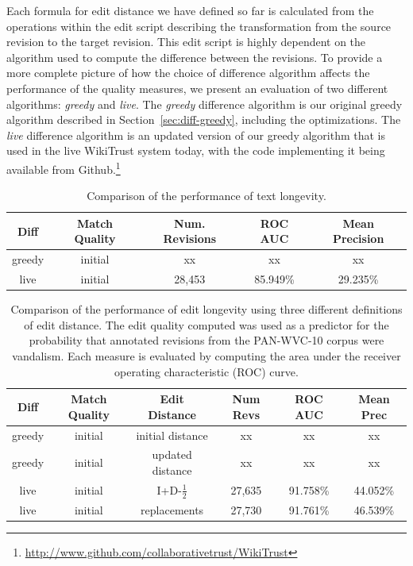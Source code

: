 Each formula for edit distance we have defined so far is calculated
from the operations within the edit script describing the transformation
from the source revision to the target revision.
This edit script is highly dependent on the algorithm used to
compute the difference between the revisions.
To provide a more complete picture of how the choice of difference
algorithm affects the performance of the quality measures,
we present an evaluation of two different algorithms:
\textit{greedy} and \textit{live}.
The \textit{greedy} difference algorithm is our original greedy
algorithm described in Section~\ref{sec:diff-greedy}, including
the optimizations.
The \textit{live} difference algorithm is an updated version of
our greedy algorithm that is used in the live WikiTrust system today,
with the code implementing it being available from
Github.\footnote{\url{http://www.github.com/collaborativetrust/WikiTrust}}

\begin{table}[tbph]
\begin{center}
\begin{tabular}{|c|c||c|c|c|}
\hline
Diff & Match Quality & Num. Revisions & ROC AUC & Mean Precision \\
\hline
\hline
greedy & initial & xx & xx & xx \\
live & initial & 28,453 & 85.949\% & 29.235\% \\
\hline
\end{tabular}
\end{center}
\caption{Comparison of the performance of text longevity.
} 
\end{table}


\begin{table}[tbph]
\begin{center}
\begin{tabular}{|c|c|c||c|c|c|}
\hline
Diff & Match Quality & Edit Distance & Num Revs & ROC AUC & Mean Prec \\
\hline
\hline
greedy & initial &initial distance & xx & xx & xx \\
greedy & initial &updated distance & xx & xx & xx \\
live & initial &I+D-$\frac{1}{2}$ & 27,635 & 91.758\% & 44.052\% \\
live & initial &replacements & 27,730 & 91.761\% & 46.539\% \\
\hline
\end{tabular}
\end{center}
\caption{Comparison of the performance of edit longevity
  using three different definitions of edit distance.
  The edit quality computed was used as a predictor for the probability
  that annotated revisions from the PAN-WVC-10 corpus were vandalism.
  Each measure is evaluated by computing the area under the
  receiver operating characteristic (ROC) curve.
} 
\end{table}


